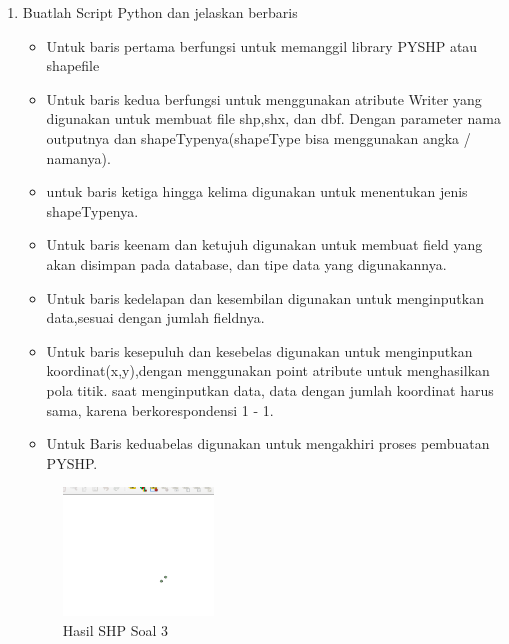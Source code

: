 \begin{enumerate}
	\item Buatlah Script Python dan jelaskan berbaris
	
	\begin{itemize}
		\item Untuk baris pertama berfungsi untuk memanggil library PYSHP atau shapefile
		\item Untuk baris kedua berfungsi untuk menggunakan atribute Writer yang digunakan untuk membuat file shp,shx, dan dbf. \hfill\break Dengan parameter nama outputnya dan shapeTypenya(shapeType bisa menggunakan angka / namanya).
		\item untuk baris ketiga hingga kelima digunakan untuk menentukan jenis shapeTypenya.
		\item Untuk baris keenam dan ketujuh digunakan untuk membuat field yang akan disimpan pada database, dan tipe data yang digunakannya.
		\item Untuk baris kedelapan dan kesembilan digunakan untuk menginputkan data,sesuai dengan jumlah fieldnya.
		\item Untuk baris kesepuluh dan kesebelas digunakan untuk menginputkan koordinat(x,y),dengan menggunakan point atribute untuk menghasilkan pola titik. \hfill\break
		saat menginputkan data, data dengan jumlah koordinat harus sama, karena berkorespondensi 1 - 1.
		\item Untuk Baris keduabelas digunakan untuk mengakhiri proses pembuatan PYSHP.
	\end{itemize}
	\hfill\break
	\begin{figure}[H]
		\includegraphics[width=4cm]{figures/1174095/2/3.png}
		\centering
		\caption{Hasil SHP Soal 3}
	\end{figure}


\end{enumerate}
